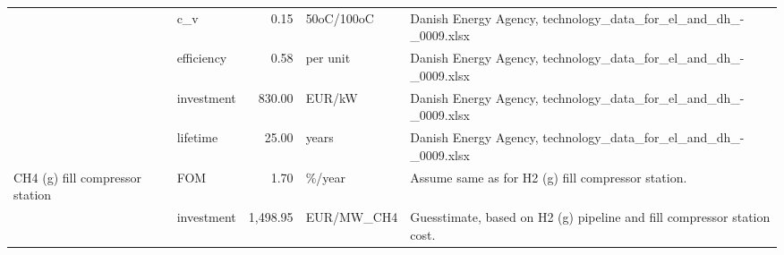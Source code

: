\begin{longtable}{p{5cm}p{3cm}rp{3cm}p{11cm}}
                      & c\_v &           0.15 &                        50oC/100oC &                                                                                                                                                                                                                                                                      Danish Energy Agency, technology\_data\_for\_el\_and\_dh\_-\_0009.xlsx \\
                      & efficiency &           0.58 &                          per unit &                                                                                                                                                                                                                                                                      Danish Energy Agency, technology\_data\_for\_el\_and\_dh\_-\_0009.xlsx \\
                      & investment &         830.00 &                            EUR/kW &                                                                                                                                                                                                                                                                      Danish Energy Agency, technology\_data\_for\_el\_and\_dh\_-\_0009.xlsx \\
                      & lifetime &          25.00 &                             years &                                                                                                                                                                                                                                                                      Danish Energy Agency, technology\_data\_for\_el\_and\_dh\_-\_0009.xlsx \\
CH4 (g) fill compressor station & FOM &           1.70 &                            \%/year &                                                                                                                                                                                                                                                                                   Assume same as for H2 (g) fill compressor station. \\
                      & investment &       1,498.95 &                        EUR/MW\_CH4 &                                                                                                                                                                                                                                                              Guesstimate, based on H2 (g) pipeline and fill compressor station cost. \\

\end{longtable}
